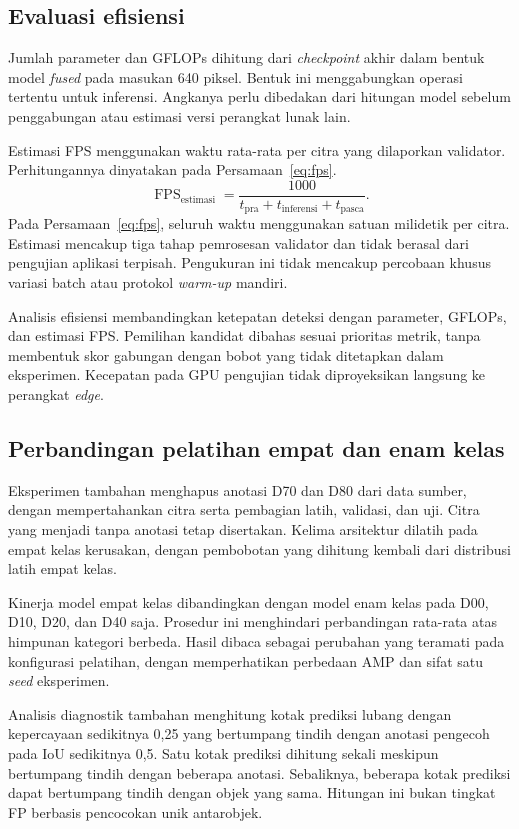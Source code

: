 \subsection{Evaluasi efisiensi}
Jumlah parameter dan GFLOPs dihitung dari \textit{checkpoint} akhir dalam bentuk model \textit{fused} pada masukan 640 piksel. Bentuk ini menggabungkan operasi tertentu untuk inferensi. Angkanya perlu dibedakan dari hitungan model sebelum penggabungan atau estimasi versi perangkat lunak lain.

Estimasi FPS menggunakan waktu rata-rata per citra yang dilaporkan validator. Perhitungannya dinyatakan pada Persamaan~\eqref{eq:fps}.
\begin{equation}
\operatorname{FPS}_{\mathrm{estimasi}}=\frac{1000}{t_{\mathrm{pra}}+t_{\mathrm{inferensi}}+t_{\mathrm{pasca}}}.
\label{eq:fps}
\end{equation}
Pada Persamaan~\eqref{eq:fps}, seluruh waktu menggunakan satuan milidetik per citra. Estimasi mencakup tiga tahap pemrosesan validator dan tidak berasal dari pengujian aplikasi terpisah. Pengukuran ini tidak mencakup percobaan khusus variasi batch atau protokol \textit{warm-up} mandiri.

Analisis efisiensi membandingkan ketepatan deteksi dengan parameter, GFLOPs, dan estimasi FPS. Pemilihan kandidat dibahas sesuai prioritas metrik, tanpa membentuk skor gabungan dengan bobot yang tidak ditetapkan dalam eksperimen. Kecepatan pada GPU pengujian tidak diproyeksikan langsung ke perangkat \textit{edge}.

\subsection{Perbandingan pelatihan empat dan enam kelas}
Eksperimen tambahan menghapus anotasi D70 dan D80 dari data sumber, dengan mempertahankan citra serta pembagian latih, validasi, dan uji. Citra yang menjadi tanpa anotasi tetap disertakan. Kelima arsitektur dilatih pada empat kelas kerusakan, dengan pembobotan yang dihitung kembali dari distribusi latih empat kelas.

Kinerja model empat kelas dibandingkan dengan model enam kelas pada D00, D10, D20, dan D40 saja. Prosedur ini menghindari perbandingan rata-rata atas himpunan kategori berbeda. Hasil dibaca sebagai perubahan yang teramati pada konfigurasi pelatihan, dengan memperhatikan perbedaan AMP dan sifat satu \textit{seed} eksperimen.

Analisis diagnostik tambahan menghitung kotak prediksi lubang dengan kepercayaan sedikitnya 0,25 yang bertumpang tindih dengan anotasi pengecoh pada IoU sedikitnya 0,5. Satu kotak prediksi dihitung sekali meskipun bertumpang tindih dengan beberapa anotasi. Sebaliknya, beberapa kotak prediksi dapat bertumpang tindih dengan objek yang sama. Hitungan ini bukan tingkat FP berbasis pencocokan unik antarobjek.


